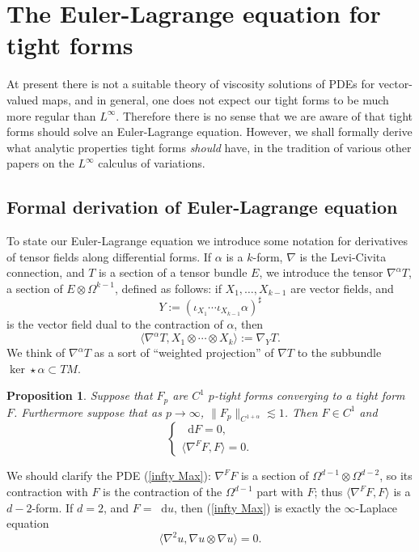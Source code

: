 \documentclass[reqno,11pt]{amsart}
\newcommand*\dif{\mathop{}\!\mathrm{d}}
\newtheorem{proposition}[theorem]{Proposition}
\theoremstyle{definition}
\numberwithin{equation}{section}
\begin{document}
\section{The Euler-Lagrange equation for tight forms}\label{infinityMax}
At present there is not a suitable theory of viscosity solutions of PDEs for vector-valued maps, and in general, one does not expect our tight forms to be much more regular than $L^\infty$.
Therefore there is no sense that we are aware of that tight forms should solve an Euler-Lagrange equation.
However, we shall formally derive what analytic properties tight forms \emph{should} have, in the tradition of various other papers \cite{Barron2001,Aronsson67,Sheffield12} on the $L^\infty$ calculus of variations.

\subsection{Formal derivation of Euler-Lagrange equation}
To state our Euler-Lagrange equation we introduce some notation for derivatives of tensor fields along differential forms.
If $\alpha$ is a $k$-form, $\nabla$ is the Levi-Civita connection, and $T$ is a section of a tensor bundle $E$, we introduce the tensor $\nabla^\alpha T$, a section of $E \otimes \Omega^{k - 1}$, defined as follows: if $X_1, \dots, X_{k - 1}$ are vector fields, and
$$Y := (\iota_{X_1} \cdots \iota_{X_{k - 1}} \alpha)^\sharp$$
is the vector field dual to the contraction of $\alpha$, then
$$\langle \nabla^\alpha T, X_1 \otimes \cdots \otimes X_k\rangle := \nabla_Y T.$$
We think of $\nabla^\alpha T$ as a sort of ``weighted projection'' of $\nabla T$ to the subbundle $\ker \star \alpha \subset TM$.

\begin{proposition}
Suppose that $F_p$ are $C^1$ $p$-tight forms converging to a tight form $F$.
Furthermore suppose that as $p \to \infty$, $\|F_p\|_{C^{1 + \alpha}} \lesssim 1$.
Then $F \in C^1$ and 
\begin{equation}\label{infty Max}
\begin{cases}
\dif F = 0, \\
\langle \nabla^F F, F\rangle = 0.
\end{cases}
\end{equation}
\end{proposition}

We should clarify the PDE (\ref{infty Max}): $\nabla^F F$ is a section of $\Omega^{d - 1} \otimes \Omega^{d - 2}$, so its contraction with $F$ is the contraction of the $\Omega^{d - 1}$ part with $F$; thus $\langle \nabla^F F, F\rangle$ is a $d - 2$-form.
If $d = 2$, and $F = \dif u$, then (\ref{infty Max}) is exactly the $\infty$-Laplace equation 
$$\langle\nabla^2 u, \nabla u \otimes \nabla u\rangle = 0.$$
\end{document}
